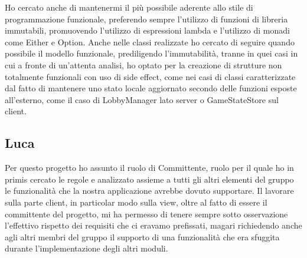 Ho cercato anche di mantenermi il più possibile aderente allo stile di programmazione funzionale, preferendo sempre l’utilizzo di funzioni di libreria immutabili, promuovendo l’utilizzo di espressioni lambda e l’utilizzo di monadi come Either e Option.
Anche nelle classi realizzate ho cercato di seguire quando possibile il modello funzionale, prediligendo l’immutabilità, tranne in quei casi in cui a fronte di un’attenta analisi, ho optato per la creazione di strutture non totalmente funzionali con uso di side effect, come nei casi di classi caratterizzate dal fatto di mantenere uno stato locale aggiornato secondo delle funzioni esposte all’esterno, come il caso di LobbyManager lato server o GameStateStore sul client.

\subsection{Luca}
Per questo progetto ho assunto il ruolo di Committente, ruolo per il quale ho in primis cercato le regole e analizzato assieme a tutti gli altri elementi del gruppo le funzionalità che la nostra applicazione avrebbe dovuto supportare. \newline \newline Il lavorare sulla parte client, in particolar modo sulla view, oltre al fatto di essere il committente del progetto, mi ha permesso di tenere sempre sotto osservazione l’effettivo rispetto dei requisiti che ci eravamo prefissati, magari richiedendo anche agli altri membri del gruppo il supporto di una funzionalità che era sfuggita durante l’implementazione degli altri moduli. 
